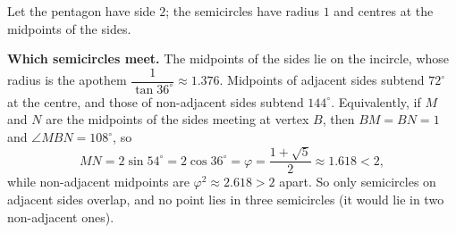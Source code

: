 Let the pentagon have side $2$; the semicircles have radius $1$ and centres at the midpoints of the sides.

\textbf{Which semicircles meet.} The midpoints of the sides lie on the incircle, whose radius is the apothem $\dfrac{1}{\tan36^\circ}\approx1.376$. Midpoints of adjacent sides subtend $72^\circ$ at the centre, and those of non-adjacent sides subtend $144^\circ$. Equivalently, if $M$ and $N$ are the midpoints of the sides meeting at vertex $B$, then $BM=BN=1$ and $\angle MBN=108^\circ$, so
\[
MN=2\sin54^\circ=2\cos36^\circ=\varphi=\dfrac{1+\sqrt5}{2}\approx1.618<2,
\]
while non-adjacent midpoints are $\varphi^2\approx2.618>2$ apart. So only semicircles on adjacent sides overlap, and no point lies in three semicircles (it would lie in two non-adjacent ones).

